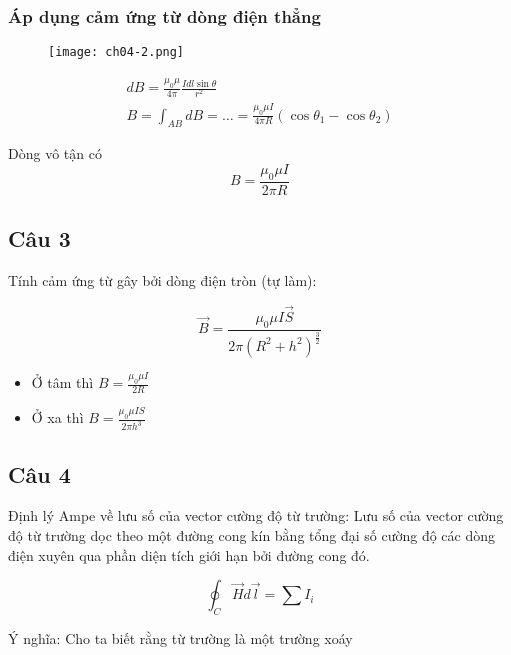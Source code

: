 \subsubsection{Áp dụng cảm ứng từ dòng điện thẳng}

\begin{figure}[h]
  \centering
  \texttt{[image: ch04-2.png]}
\end{figure}

\begin{gather*}
  dB = \frac{\mu_0\mu}{4\pi} \frac{Idl\sin\theta}{r^2} \\
  B = \int_{AB} dB = \dots = \frac{\mu_0\mu I}{4\pi R} \left( \cos \theta_1 - \cos \theta_2 \right)
\end{gather*}

Dòng vô tận có 
\begin{equation*}
  B = \frac{\mu_0\mu I}{2\pi R}
\end{equation*}

\subsection{Câu 3}

Tính cảm ứng từ gây bởi dòng điện tròn (tự làm):

\begin{equation*}
  \vec{B} = \frac{\mu_0 \mu I \vec{S}}{2\pi (R^2 + h^2)^{\frac{3}{2}}}
\end{equation*}

\begin{itemize}
  \item Ở tâm thì $B = \frac{\mu_0 \mu I}{2R}$
  \item Ở xa thì $B = \frac{\mu_0 \mu IS}{2\pi h^3}$
\end{itemize}

\subsection{Câu 4}

Định lý Ampe về lưu số của vector cường độ từ trường: Lưu số của vector cường độ từ trường dọc theo một đường cong kín bằng tổng đại số cường độ các dòng điện xuyên qua phần diện tích giới hạn bởi đường cong đó.

\begin{equation*}
  \oint_C \vec{H}d\vec{l} = \sum I_i
\end{equation*}

Ý nghĩa: Cho ta biết rằng từ trường là một trường xoáy

